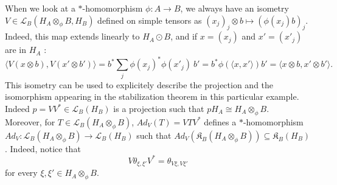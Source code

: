 \begin{rk}\label{isometry}
When we look at a $*$-homomorphism $\phi : A\rightarrow B$, we always have an isometry $V\in \mathcal L_B ( H_A\otimes_\phi B , H_B)$ defined on simple tensors as $(x_j)_j\otimes b \mapsto (\phi(x_j)b)_j$. Indeed, this map extends linearly to $H_A \odot B$, and if $x = (x_j)$ and $x'=(x'_j)$ are in $H_A$ : 
\[\langle V (x\otimes b) , V(x'\otimes b')\rangle = b^* \sum_j \phi(x_j)^* \phi(x'_j) \  b' = b^*\phi(\langle x, x' \rangle)b' = \langle x\otimes b , x'\otimes b' \rangle . \] %
This isometry can be used to explicitely describe the projection and the isomorphism appearing in the stabilization theorem in this particular example. Indeed $p = VV^*\in\mathcal L_B(H_B)$ is a projection such that $p H_A \cong H_A\otimes_\phi B $.\\

Moreover, for $T\in \mathcal L_B(H_A\otimes_\phi B)$, $Ad_V(T) = VTV^*$ defines a $*$-homomorphism $Ad_V : \mathcal L_B(H_A\otimes_\phi B)\rightarrow \mathcal L_B(H_B)$ such that $Ad_V(\mathfrak K_B(H_A\otimes_\phi B))\subseteq \mathfrak K_B(H_B)$. Indeed, notice that 
\[V\theta_{\xi,\xi'}V^* = \theta_{V\xi,V\xi'}\]
for every $\xi,\xi'\in H_A\otimes_\phi B$.  
\end{rk}
